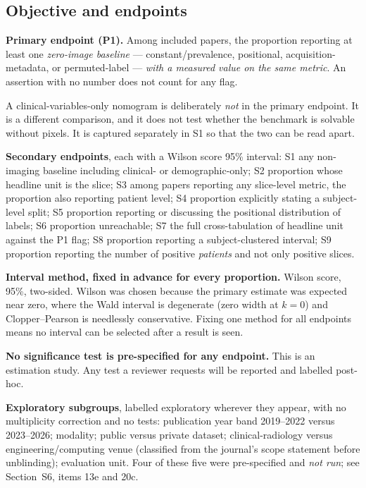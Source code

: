 \documentclass[11pt,a4paper]{article}
\begin{document}
\subsection{Objective and endpoints}

\textbf{Primary endpoint (P1).} Among included papers, the proportion reporting at
least one \emph{zero-image baseline} --- constant/prevalence, positional,
acquisition-metadata, or permuted-label --- \emph{with a measured value on the same
metric}. An assertion with no number does not count for any flag.

A clinical-variables-only nomogram is deliberately \emph{not} in the primary
endpoint. It is a different comparison, and it does not test whether the benchmark is
solvable without pixels. It is captured separately in S1 so that the two can be read
apart.

\textbf{Secondary endpoints}, each with a Wilson score 95\% interval: S1 any
non-imaging baseline including clinical- or demographic-only; S2 proportion whose
headline unit is the slice; S3 among papers reporting any slice-level metric, the
proportion also reporting patient level; S4 proportion explicitly stating a
subject-level split; S5 proportion reporting or discussing the positional
distribution of labels; S6 proportion unreachable; S7 the full cross-tabulation of
headline unit against the P1 flag; S8 proportion reporting a subject-clustered
interval; S9 proportion reporting the number of positive \emph{patients} and not only
positive slices.

\textbf{Interval method, fixed in advance for every proportion.} Wilson score, 95\%,
two-sided. Wilson was chosen because the primary estimate was expected near zero,
where the Wald interval is degenerate (zero width at $k=0$) and Clopper--Pearson is
needlessly conservative. Fixing one method for all endpoints means no interval can be
selected after a result is seen.

\textbf{No significance test is pre-specified for any endpoint.} This is an
estimation study. Any test a reviewer requests will be reported and labelled
post-hoc.

\textbf{Exploratory subgroups}, labelled exploratory wherever they appear, with no
multiplicity correction and no tests: publication year band 2019--2022 versus
2023--2026; modality; public versus private dataset; clinical-radiology versus
engineering/computing venue (classified from the journal's scope statement before
unblinding); evaluation unit. Four of these five were pre-specified and \emph{not
run}; see Section~S6, items 13e and 20c.
\end{document}
